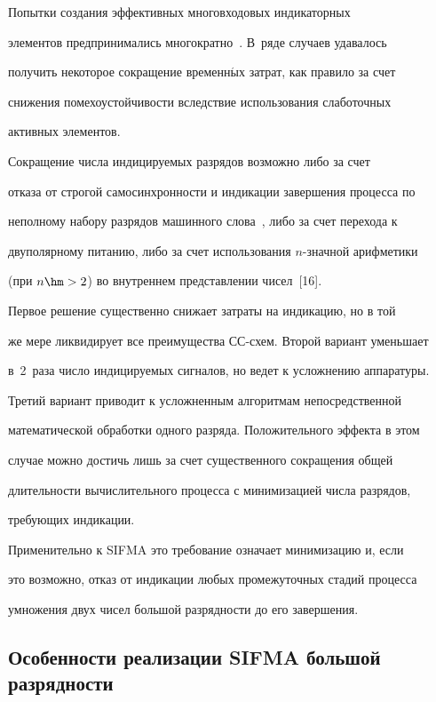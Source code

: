       Попытки создания эффективных многовходовых индикаторных

элементов предпринимались многократно~\cite{2-st1, 6-st1, 7-st1}. В~ряде случаев удавалось

получить некоторое сокращение временн$\acute{\mbox{ы}}$х затрат, как правило за счет

снижения помехоустойчивости вследствие использования слаботочных

активных элементов.



      Сокращение числа индицируемых разрядов возможно либо за счет

отказа от строгой самосинхронности и индикации завершения процесса по

неполному набору разрядов машинного слова~\cite{1-st1, 5-st1}, либо за счет перехода к

двуполярному питанию, либо за счет использования $n$-знач\-ной арифметики

(при $n \hm> 2$) во внутреннем представлении чисел~[16].



      Первое решение существенно снижает затраты на индикацию, но в той

же мере ликвидирует все преимущества СС-схем. Второй вариант уменьшает

в~2~раза число индицируемых сигналов, но ведет к усложнению аппаратуры.

Третий вариант приводит к усложненным алгоритмам непосредственной

математической обработки одного разряда. Положительного эффекта в этом

случае можно достичь лишь за счет существенного сокращения общей

длительности вычислительного процесса с минимизацией числа разрядов,

требующих индикации.



      Применительно к SIFMA это требование означает минимизацию и, если

это возможно, отказ от индикации любых промежуточных стадий процесса

умножения двух чисел большой разрядности до его завершения.



\subsection{Особенности реализации SIFMA большой разрядности}



